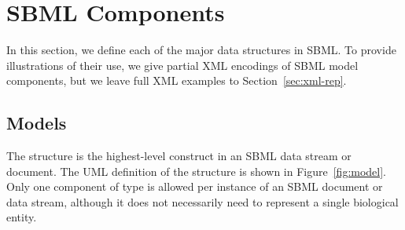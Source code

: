 \documentclass[10pt]{cekarticle}
\newcommand{\vref}[1]{\ref{#1}}
\begin{document}




\section{SBML Components}
\label{sec:elements}

In this section, we define each of the major data structures in SBML.  To
provide illustrations of their use, we give partial XML encodings of SBML
model components, but we leave full XML examples to
Section~\ref{sec:xml-rep}.


\subsection{Models}
\label{sec:model}

The  structure is the highest-level construct in an SBML data
stream or document.  The UML definition of the  structure is
shown in Figure~\vref{fig:model}.  Only one component of type 
is allowed per instance of an SBML document or data stream, although it
does not necessarily need to represent a single biological entity.
\end{document}
